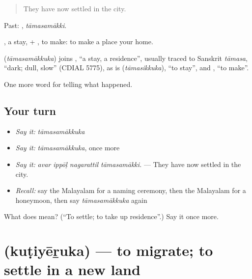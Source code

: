 \begin{quote}
They have now settled in the city.
\end{quote}

Past: , \emph{tāmasamākki}.

, a stay, + , to make: to make a place your home.

\begin{cousinweb}
\textbf{} (\emph{tāmasamākkuka}) joins , \textquotedblleft{}a stay, a residence\textquotedblright{}, usually traced to Sanskrit \emph{tāmasa}, \textquotedblleft{}dark; dull, slow\textquotedblright{} (CDIAL 5775), as is  (\emph{tāmasikkuka}), \textquotedblleft{}to stay\textquotedblright{}, and , \textquotedblleft{}to make\textquotedblright{}.
\end{cousinweb}

\begin{grammarlens}[title={What you've built}]
One more word for telling what happened.
\end{grammarlens}

\subsection*{Your turn}
\begin{itemize}
\raggedright
  \item \emph{Say it:} \emph{tāmasamākkuka}
  \item \emph{Say it:} \emph{tāmasamākkuka}, once more
  \item \emph{Say it:} \emph{avar ippōḷ nagarattil tāmasamākki.} — They have now settled in the city.
  \item \emph{Recall:} say the Malayalam for a naming ceremony, then the Malayalam for a honeymoon, then say \emph{tāmasamākkuka} again
\end{itemize}

\begin{tcolorbox}[breakable,colback=teal!4,colframe=teal!35!black,title={Before you move on}]
What does  mean? (\textquotedblleft{}To settle; to take up residence\textquotedblright{}.) Say it once more.
\end{tcolorbox}
\section[\texorpdfstring{\ml{കുടിയേറുക} (kuṭiyēṟuka)}{കുടിയേറുക (kuṭiyēṟuka)}]{ (kuṭiyēṟuka) — to migrate; to settle in a new land}

